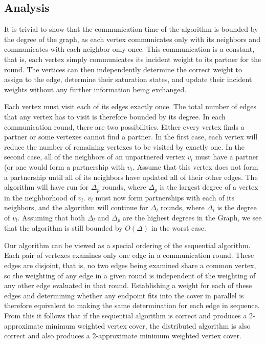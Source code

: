 \documentclass[conference, 11pt]{IEEEtran}
\theoremstyle{definition}
\begin{document}
\subsection{Analysis}
It is trivial to show that the communication time of the algorithm is bounded by the degree of the graph, as each vertex communicates only with its neighbors and communicates with each neighbor only once. This communication is a constant, that is, each vertex simply communicates its incident weight to its partner for the round. The vertices can then independently determine the correct weight to assign to the edge, determine their saturation states, and update their incident weights without any further information being exchanged.

Each vertex must visit each of its edges exactly once. The total number of edges that any vertex has to visit is therefore bounded by its degree. In each communication round, there are two possibilities. Either every vertex finds a partner or some vertexes cannot find a partner. In the first case, each vertex will reduce the number of remaining vertexes to be visited by exactly one. In the second case, all of the neighbors of an unpartnered vertex $v_l$ must have a partner (or one would form a partnership with $v_l$. Assume that this vertex does not form a partnership until all of its neighbors have updated all of their other edges. The algorithm will have run for $\Delta_p$ rounds, where $\Delta_p$ is the largest degree of a vertex in the neighborhood of $v_l$. $v_l$ must now form partnerships with each of its neighbors, and the algorithm will continue for $\Delta_l$ rounds, where $\Delta_l$ is the degree of $v_l$. Assuming that both $\Delta_l$ and $\Delta_p$ are the highest degrees in the Graph, we see that the algorithm is still bounded by $O(\Delta)$ in the worst case.

Our algorithm can be viewed as a special ordering of the sequential algorithm. Each pair of vertexes examines only one edge in a communication round. These edges are disjoint, that is, no two edges being examined share a common vertex, so the weighting of any edge in a given round is independent of the weighting of any other edge evaluated in that round. Establishing a weight for each of these edges and determining whether any endpoint fits into the cover in parallel is therefore equivalent to making the same determination for each edge in sequence. From this it follows that if the sequential algorithm is correct and produces a 2-approximate minimum weighted vertex cover, the distributed algorithm is also correct and also produces a 2-approximate minimum weighted vertex cover.   
\end{document}
